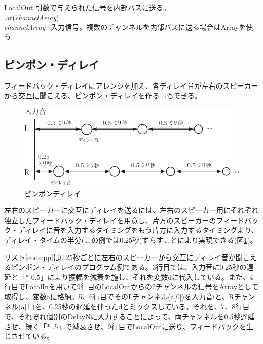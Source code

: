 \documentclass{jsarticle}
\begin{document}
\begin{itembox}[l]{LocalOut}
	{\footnotesize 
	引数で与えられた信号を内部バスに送る。\\
	.ar({\it channelArray})\\
	{\it channelArray}$\cdots$入力信号。複数のチャンネルを内部バスに送る場合はArrayを使う\\
	}
\end{itembox}

\subsection{ピンポン・ディレイ}
フィードバック・ディレイにアレンジを加え、各ディレイ音が左右のスピーカーから交互に聞こえる、ピンポン・ディレイを作る事もできる。

\begin{figure}[htbp]
	\begin{center}
		\includegraphics[scale=0.65]{pingpong.pdf}
	\end{center}
	\caption{ピンポンディレイ}
	\label{fig:pingpong}
\end{figure}

左右のスピーカーに交互にディレイを送るには、左右のスピーカー用にそれぞれ独立したフィードバック・ディレイを用意し、片方のスピーカーのフィードバック・ディレイに音を入力するタイミングをもう片方に入力するタイミングより、ディレイ・タイムの半分(この例では0.25秒)ずらすことにより実現できる(図\ref{fig:pingpong})。

リスト\ref{code:pp}は0.25秒ごとに左右のスピーカーから交互にディレイ音が聞こえるピンポン・ディレイのプログラム例である。3行目では、入力音に0.25秒の遅延と「* 0.5」により振幅を減衰を施し、それを変数dに代入している。また、4行目でLocalInを用いて9行目のLocalOutからの2チャンネルの信号をArrayとして取得し、変数aに格納。5、6行目でそのLチャンネル(a[0])を入力音iと、Rチャンネル(a[1])を、0.25秒の遅延を伴ったdとミックスしている。それを、7、8行目で、それぞれ個別のDelayNに入力することによって、両チャンネルを0.5秒遅延させ、続く「* .5」で減衰させ、9行目でLocalOutに送り、フィードバックを生じさせている。
\end{document}

